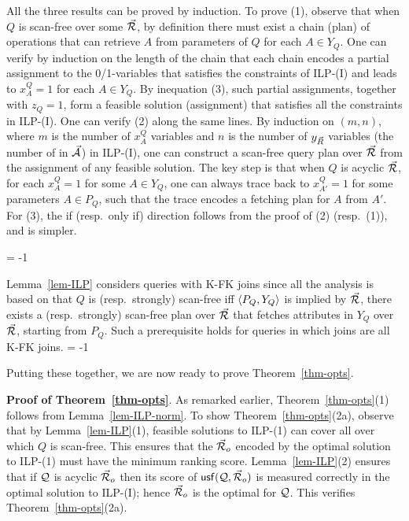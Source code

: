 \begin{proofS}
All the three results can be proved by induction. 
To prove (1), observe that when $Q$ is scan-free
over some \bds $\vec{{\mathcal R}}$, by definition there must exist a chain
(\ie plan)
of \get operations that can retrieve $A$ from parameters of $Q$
for each $A\in Y_{Q}$. One can verify by induction on the length
of the chain that each chain encodes a partial assignment to the
0/1-variables that satisfies the constraints of ILP-(I) and leads to
$x_{A}^{Q} = 1$ for each $A\in Y_{Q}$. By inequation (3), such
partial assignments, together with $z_{Q} = 1$, form a feasible
solution (\ie assignment) that satisfies all the constraints
in ILP-(I).
%
One can verify
(2) along the same lines. By induction on $(m, n)$,
where $m$ is the number of $x_{A}^{Q}$ variables and $n$ is the
number of $y_{\vec{R}}$ variables (\ie the number of \bss in
$\vec{{\mathcal A}}$) in ILP-(I), one can construct a scan-free query plan
over $\vec{{\mathcal R}}$ from the assignment of any feasible solution. The
key step is that when $Q$ is acyclic \wrt $\vec{{\mathcal R}}$, for each
$x_{A}^{Q} = 1$ for some $A\in Y_{Q}$, one can always trace back
to $x_{A'}^{Q} = 1$ for some parameters $A\in P_{Q}$, such that
the trace encodes a fetching plan for $A$ from $A'$.
For (3), the if (resp.~only if) direction follows from the proof
of (2) (resp.~(1)), and is simpler. 
\end{proofS}
\looseness = -1

Lemma~\ref{lem-ILP} considers \SPC queries with K-FK joins 
since all the analysis is based on that $Q$ is
(resp.~strongly) scan-free iff $\langle P_{Q},\allowbreak Y_{Q}\rangle$ is
implied by $\vec{{\mathcal R}}$, \ie there exists a (resp.~strongly) scan-free
plan over $\vec{{\mathcal R}}$ that fetches attributes in $Y_{Q}$ over
$\vec{{\mathcal R}}$, starting from $P_{Q}$. Such a prerequisite holds for
\SPC queries in which joins are all K-FK joins.
\looseness = -1

Putting these together, we are now ready to prove
  Theorem~\ref{thm-opts}.

\vspace{0.8ex}
\noindent
    {\bf Proof of Theorem~\ref{thm-opts}}. As remarked earlier,
    Theorem~\ref{thm-opts}(1) follows from Lemma~\ref{lem-ILP-norm}.
To show  Theorem~\ref{thm-opts}(2a), observe that
by Lemma~\ref{lem-ILP}(1), feasible solutions to ILP-(1) can
cover all \bdss over which $Q$ is scan-free. This ensures that
the \bds $\vec{{\mathcal R}}_{o}$ encoded by the optimal solution to ILP-(1)
must have the minimum ranking score.
Lemma~\ref{lem-ILP}(2) ensures that if $\mathcal Q$ is
acyclic \wrt $\vec{{\mathcal R}}_{o}$ then its score of ${\mathsf{usf}}(\mathcal Q,\allowbreak
\vec{{\mathcal R}}_{o})$ is measured correctly in the optimal solution to
ILP-(I); hence $\vec{{\mathcal R}}_{o}$ is the optimal \bds for $\mathcal Q$. This
verifies Theorem~\ref{thm-opts}(2a).

